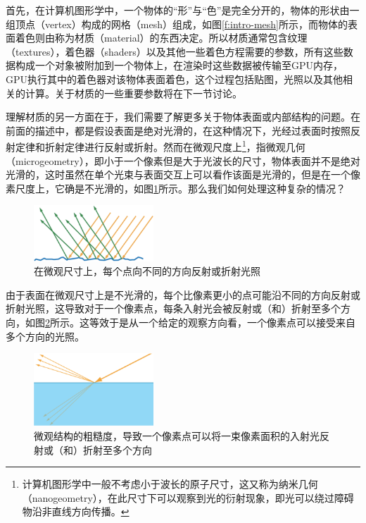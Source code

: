 首先，在计算机图形学中，一个物体的“形”与“色”是完全分开的，物体的形状由一组顶点（vertex）构成的网格（mesh）组成，如图\ref{f:intro-mesh}所示，而物体的表面着色则由称为材质（material）的东西决定。所以材质通常包含纹理（textures），着色器（shaders）以及其他一些着色方程需要的参数，所有这些数据构成一个对象被附加到一个物体上，在渲染时这些数据被传输至GPU内存，GPU执行其中的着色器对该物体表面着色，这个过程包括贴图，光照以及其他相关的计算。关于材质的一些重要参数将在下一节讨论。

理解材质的另一方面在于，我们需要了解更多关于物体表面或内部结构的问题。在前面的描述中，都是假设表面是绝对光滑的，在这种情况下，光经过表面时按照反射定律和折射定律进行反射或折射。然而在微观尺度上\footnote{计算机图形学中一般不考虑小于波长的原子尺寸，这又称为纳米几何（nanogeometry），在此尺寸下可以观察到光的衍射现象，即光可以绕过障碍物沿非直线方向传播。}，指微观几何（microgeometry），即小于一个像素但是大于光波长的尺寸，物体表面并不是绝对光滑的，这时虽然在单个光束与表面交互上可以看作该面是光滑的，但是在一个像素尺度上，它确是不光滑的，如图\ref{f:intro-microgeometry-1}所示。那么我们如何处理这种复杂的情况？

\begin{figure}
\sidecaption
	\includegraphics[width=0.4\textwidth]{figures/intro/ray-optics-3}
	\caption{在微观尺寸上，每个点向不同的方向反射或折射光照}
	\label{f:intro-microgeometry-1}
\end{figure}

由于表面在微观尺寸上是不光滑的，每个比像素更小的点可能沿不同的方向反射或折射光照，这导致对于一个像素点，每条入射光会被反射或（和）折射至多个方向，如图\ref{f:intro-multi-rays}所示。这等效于是从一个给定的观察方向看，一个像素点可以接受来自多个方向的光照。

\begin{figure}
\sidecaption
	\includegraphics[width=0.4\textwidth]{figures/intro/ray-optics-4}
	\caption{微观结构的粗糙度，导致一个像素点可以将一束像素面积的入射光反射或（和）折射至多个方向}
	\label{f:intro-multi-rays}
\end{figure}

